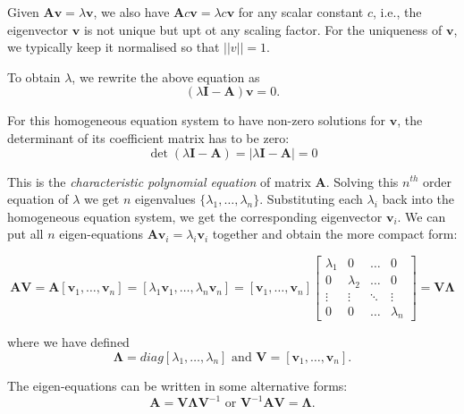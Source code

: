 \documentclass[10pt,b5paper,titlepage]{book}
\begin{document}
Given $\mathbf{A}\mathbf{v}=\lambda\mathbf{v}$, we also have $\mathbf{A}c\mathbf{v}=\lambda{}c\mathbf{v}$ for any scalar constant $c$, i.e., the eigenvector $\mathbf{v}$ is not unique but upt ot any scaling factor. For the uniqueness of $\mathbf{v}$, we typically keep it normalised so that $||v|| = 1$.

To obtain $\lambda$, we rewrite the above equation as
\begin{equation}
(\lambda\mathbf{I}-\mathbf{A})\mathbf{v}=0
.\end{equation}

For this homogeneous equation system to have non-zero solutions for $\mathbf{v}$, the determinant of its coefficient matrix has to be zero:
\begin{equation}
\det{(\lambda\mathbf{I}-\mathbf{A})}=|\lambda\mathbf{I}-\mathbf{A}|=0
\end{equation}

This is the \textit{characteristic polynomial equation} of matrix $\mathbf{A}$. Solving this $n^{th}$ order equation of $\lambda$ we get $n$ eigenvalues $\{\lambda_{1},\dots,\lambda_{n}\}$. Substituting each $\lambda{}_{i}$ back into the homogeneous equation system, we get the corresponding eigenvector $\mathbf{v}_{i}$. We can put all $n$ eigen-equations $\mathbf{A}\mathbf{v}_{i}=\lambda{}_{i}\mathbf{v}_{i}$ together and obtain the more compact form:

\begin{equation}
\mathbf{A}\mathbf{V} = \mathbf{A}[\mathbf{v}_{1},\dots,\mathbf{v}_{n}] = [\lambda{}_{1}\mathbf{v}_{1},\dots,\lambda{}_{n}\mathbf{v}_{n}] =
[\mathbf{v}_{1},\dots,\mathbf{v}_{n}]\begin{bmatrix}
\lambda{}_{1} & 0 & \dots & 0\\
0 & \lambda{}_{2} & \dots & 0\\
\vdots & \vdots & \ddots & \vdots\\
0 & 0 & \dots & \lambda{}_{n}
\end{bmatrix}
= \mathbf{V}\mathbf{\Lambda{}}
\end{equation}

where we have defined
\begin{equation}
\mathbf{\Lambda{}} = \mathit{diag}[\lambda{}_{1},\dots,\lambda{}_{n}] \text{ and } \mathbf{V} = [\mathbf{v}_{1},\dots,\mathbf{v}_{n}]
.\end{equation}

The eigen-equations can be written in some alternative forms:
\begin{equation}
\mathbf{A} = \mathbf{V}\mathbf{\Lambda{}}\mathbf{V}^{-1} \text{ or } \mathbf{V}^{-1}\mathbf{A}\mathbf{V} = \mathbf{\Lambda}
.\end{equation}
\end{document}
